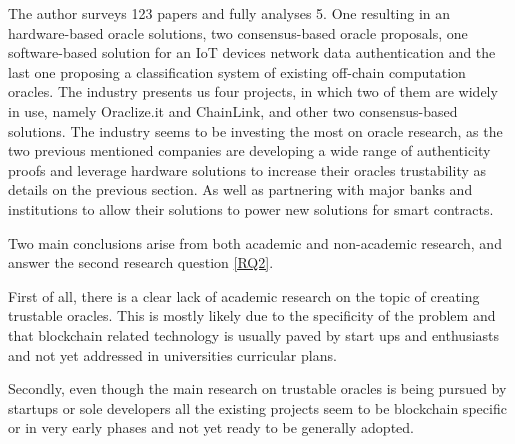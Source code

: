 The author surveys 123 papers and fully analyses 5. One resulting in an hardware-based oracle solutions, two consensus-based oracle proposals, one software-based solution for an IoT devices network data authentication and the last one proposing a classification system of existing off-chain computation oracles. The industry presents us four projects, in which two of them are widely in use, namely Oraclize.it and ChainLink, and other two consensus-based solutions. The industry seems to be investing the most on oracle research, as the two previous mentioned companies are developing a wide range of authenticity proofs and leverage hardware solutions to increase their oracles trustability as details on the previous section. As well as partnering with major banks and institutions to allow their solutions to power new solutions for smart contracts.

Two main conclusions arise from both academic and non-academic research, and answer the second research question \ref{RQ2}.

First of all, there is a clear lack of academic research on the topic of creating trustable oracles. This is mostly likely due to the specificity of the problem and that blockchain related technology is usually paved by start ups and enthusiasts and not yet addressed in universities curricular plans.

Secondly, even though the main research on trustable oracles is being pursued by startups or sole developers all the existing projects seem to be blockchain specific or in very early phases and not yet ready to be generally adopted.